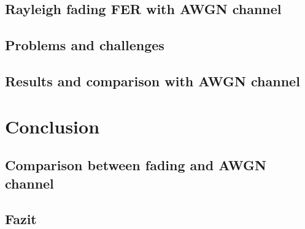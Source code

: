 \documentclass[12pt,oneside, reqno]{report}
\begin{document}
\section{Rayleigh fading FER with AWGN channel}

\section{Problems and challenges}

\section{Results and comparison with AWGN channel}


\chapter{Conclusion}

\section{Comparison between fading and AWGN channel}

\section{Fazit}




 
















%
\end{document}
